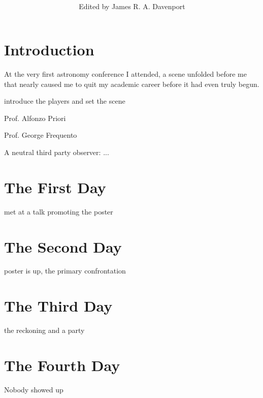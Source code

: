 \documentclass[12pt,preprint]{aastex}
\begin{document}
\title{{ \\
\vspace{0.5cm}{\Huge sopra i due massimi}\\
\vspace{0.5cm}{\Huge sistemi del mondo:}\\
\vspace{0.5cm}{\Huge a Bayesian approach}}\vspace{10cm}}
 
\author{Edited by James R. A. Davenport}

\section*{}
\clearpage



\section*{Introduction}
At the very first astronomy conference I attended, a scene unfolded before me that nearly caused me to quit my academic career before it had even truly begun.


introduce the players and set the scene

Prof. Alfonzo Priori

Prof. George Frequento

A neutral third party observer: ...

\section{The First Day}
met at a talk promoting the poster

\section{The Second Day}
poster is up, the primary confrontation

\section{The Third Day}
the reckoning and a party

\section{The Fourth Day}
Nobody showed up



%
\end{document}
